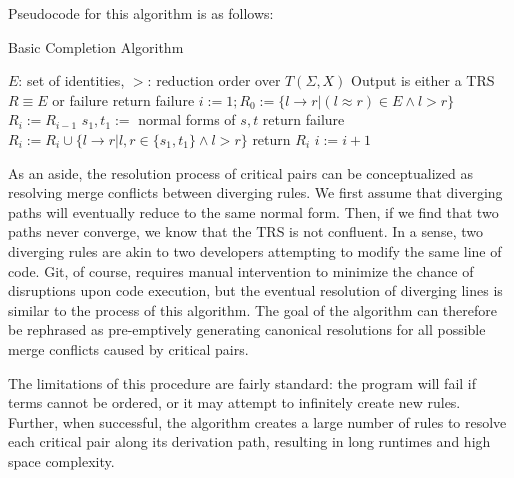 \documentclass{article}
\begin{document}
Pseudocode for this algorithm is as follows:
\begin{algorithm}[H]
\caption{Basic Completion Algorithm}\label{alg:cap}
\begin{algorithmic}
\Require $E$: set of identities, $>$: reduction order over $T(\Sigma,X)$
\Ensure Output is either a TRS $R \equiv E$ or failure
return failure
\EndIf
\State $i:=1; R_0 := \{l \rightarrow r | (l \approx r) \in E \land l > r\}$
\State $R_i := R_{i-1}$
\State $s_1,t_1 :=$ normal forms of $s,t$
return failure
\EndIf
\State $R_i := R_i \cup \{l \rightarrow r | l,r \in \{s_1, t_1\} \land l > r\}$
\EndFor
{}
return $R_i$
\EndIf
\State $i := i+1$
\EndWhile
\end{algorithmic}
\end{algorithm}

As an aside, the resolution process of critical pairs can be conceptualized as resolving merge conflicts between diverging rules.
We first assume that diverging paths will eventually reduce to the same normal form. Then, if we find that two
paths never converge, we know that the TRS is not confluent.
In a sense, two diverging rules are akin to two developers attempting to modify the same line of code. Git, of course, requires manual intervention
to minimize the chance of disruptions upon code execution, but the eventual resolution of diverging lines is similar to the process of this algorithm.
The goal of the algorithm can therefore be rephrased as pre-emptively generating canonical resolutions for all possible merge conflicts caused by critical pairs.

The limitations of this procedure are fairly standard: the program will fail if terms cannot be ordered, or it may attempt to infinitely create new rules.
Further, when successful, the algorithm creates a large number of rules to resolve each critical pair along its derivation path, resulting in
long runtimes and high space complexity.
\end{document}
